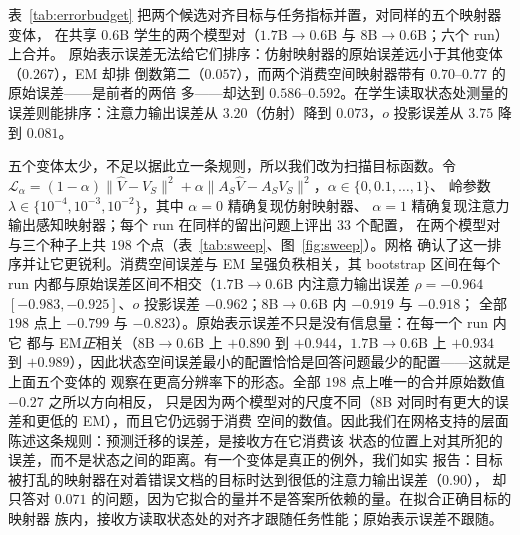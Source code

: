 \documentclass[11pt]{article}
\begin{document}
表~\ref{tab:errorbudget} 把两个候选对齐目标与任务指标并置，对同样的五个映射器变体，
在共享 $0.6$B 学生的两个模型对（$1.7$B$\to0.6$B 与 $8$B$\to0.6$B；六个 run）上合并。
原始表示误差无法给它们排序：仿射映射器的原始误差远小于其他变体（$0.267$），EM 却排
倒数第二（$0.057$），而两个消费空间映射器带有 $0.70$--$0.77$ 的原始误差——是前者的两倍
多——却达到 $0.586$--$0.592$。在学生读取状态处测量的误差则能排序：注意力输出误差从
$3.20$（仿射）降到 $0.073$，$o$ 投影误差从 $3.75$ 降到 $0.081$。

五个变体太少，不足以据此立一条规则，所以我们改为扫描目标函数。令
$\mathcal{L}_\alpha = (1-\alpha)\|\hat V - V_S\|^2 +
\alpha\|A_S\hat V - A_S V_S\|^2$，$\alpha \in \{0, 0.1, \dots, 1\}$、
岭参数 $\lambda \in \{10^{-4}, 10^{-3}, 10^{-2}\}$，其中 $\alpha=0$ 精确复现仿射映射器、
$\alpha=1$ 精确复现注意力输出感知映射器；每个 run 在同样的留出问题上评出 $33$ 个配置，
在两个模型对与三个种子上共 $198$ 个点（表~\ref{tab:sweep}、图~\ref{fig:sweep}）。网格
确认了这一排序并让它更锐利。消费空间误差与 EM 呈强负秩相关，其 bootstrap 区间在每个 run
内都与原始误差区间不相交（$1.7$B$\to0.6$B 内注意力输出误差 $\rho=-0.964$
$[-0.983,-0.925]$、$o$ 投影误差 $-0.962$；$8$B$\to0.6$B 内 $-0.919$ 与 $-0.918$；
全部 $198$ 点上 $-0.799$ 与 $-0.823$）。原始表示误差不只是没有信息量：在每一个 run 内它
都与 EM\emph{正}相关（$8$B$\to0.6$B 上 $+0.890$ 到 $+0.944$，$1.7$B$\to0.6$B 上 $+0.934$
到 $+0.989$），因此状态空间误差最小的配置恰恰是回答问题最少的配置——这就是上面五个变体的
观察在更高分辨率下的形态。全部 $198$ 点上唯一的合并原始数值 $-0.27$ 之所以方向相反，
只是因为两个模型对的尺度不同（$8$B 对同时有更大的误差和更低的 EM），而且它仍远弱于消费
空间的数值。因此我们在网格支持的层面陈述这条规则：预测迁移的误差，是接收方在它消费该
状态的位置上对其所犯的误差，而不是状态之间的距离。有一个变体是真正的例外，我们如实
报告：目标被打乱的映射器在对着错误文档的目标时达到很低的注意力输出误差（$0.90$），
却只答对 $0.071$ 的问题，因为它拟合的量并不是答案所依赖的量。在拟合正确目标的映射器
族内，接收方读取状态处的对齐才跟随任务性能；原始表示误差不跟随。
\end{document}
